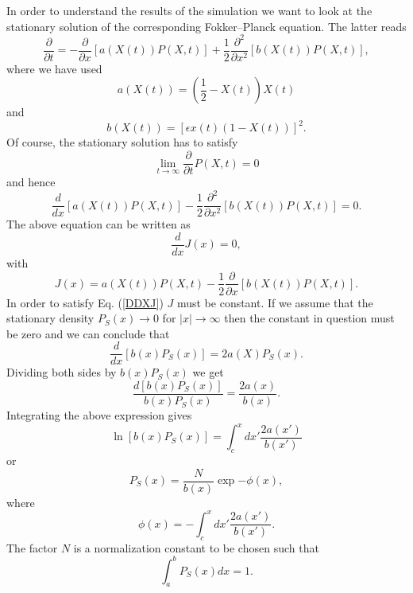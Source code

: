 In order to understand the results of the simulation  we want to 
look at the stationary solution of the corresponding 
Fokker--Planck equation. The latter reads
\begin{equation*}
\frac{\partial}{\partial t} = - \frac{\partial}{\partial x} [a(X(t)) P(X,t) ]
      + \frac{1}{2} \frac{\partial^2}{\partial 
      x^2}[b(X(t))P(X,t)],
\end{equation*}
where we have used
\begin{equation*}
a(X(t)) = (\frac{1}{2} - X(t))X(t)
\end{equation*}
and
\begin{equation*}
b(X(t)) = [\epsilon x(t) (1-X(t))]^2.
\end{equation*}
Of course, the stationary solution has to satisfy
\begin{equation*}
\lim_{t \rightarrow \infty} \frac{\partial}{\partial t} P(X,t) =0
\end{equation*}
and hence
\begin{equation*}
\frac{d}{dx} [a(X(t)) P(X,t) ] - \frac{1}{2} \frac{\partial^2}{\partial 
      x^2}[b(X(t))P(X,t)] =0.
\end{equation*}
The above equation can be written as
\begin{equation}
\label{DDXJ}
\frac{d}{dx} J(x) =0,
\end{equation}
with 
\begin{equation*}
J(x) = a(X(t)) P(X,t)  - \frac{1}{2} \frac{\partial}{\partial 
      x}[b(X(t))P(X,t)].
\end{equation*}
In order to satisfy Eq. (\ref{DDXJ}) $J$ must be constant. If we 
assume that the stationary density $P_S(x) \longrightarrow 0$ for 
$|x| \longrightarrow \infty$ then the constant in question must be 
zero and we can conclude that
\begin{equation*}
\frac{d}{dx} [b(x) P_S(x)] = 2 a(X)P_S(x).
\end{equation*}
Dividing both sides by $b(x)P_S(x)$ we get
\begin{equation*}
\frac{d [b(x) P_S(x)]}{b(x) P_S(x)} = \frac{2a(x)}{b(x)}.
\end{equation*}
Integrating the above expression gives
\begin{equation*}
\ln [b(x) P_S(x)] = \int_c^x dx' \frac{2a(x')}{b(x')}
\end{equation*}
or
\begin{equation*}
P_S(x) = \frac{N}{b(x)} \exp{-\phi (x)},
\end{equation*}
where
\begin{equation*}
\phi(x) = - \int_c^x dx' \frac{2a(x')}{b(x')}.
\end{equation*}
The factor $N$ is a normalization constant to be chosen such that
\begin{equation*}
\int_a^b P_S(x) dx =1.
\end{equation*}

